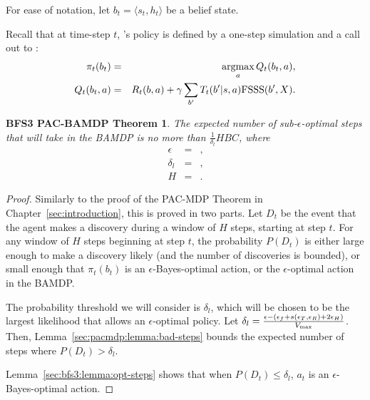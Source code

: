 For ease of notation, let $b_t = \langle s_t, h_t \rangle$ be a belief state.

Recall that at time-step $t$, 's policy is defined by a one-step simulation and a call out to :
\begin{eqnarray}
\pi_t(b_t) &=& \argmax_a Q_t(b_t,a),\\
Q_t(b_t,a) &=& R_t(b,a) + \gamma \sum_{b'} T_t(b'|s,a) \mbox{FSSS}(b',X).
\end{eqnarray}

\newtheorem*{bfs3thm}{BFS3 PAC-BAMDP Theorem}
\begin{bfs3thm}
The expected number of sub-$\epsilon$-optimal steps that  will take in the BAMDP is no more than $\frac 1 {\delta_l} H B C$, where
\begin{eqnarray}
\epsilon &=&,\\
\delta_l &=&,\\
H &=&.
\end{eqnarray}
\end{bfs3thm}

\begin{proof}
Similarly to the proof of the PAC-MDP Theorem in Chapter~\ref{sec:introduction}, this is proved in two parts. Let $D_t$ be the event that the agent makes a discovery during a window of $H$ steps, starting at step $t$. For any window of $H$ steps beginning at step $t$, the probability $P(D_t)$ is either large enough to make a discovery likely (and the number of discoveries is bounded), or small enough that $\pi_t(b_t)$ is an $\epsilon$-Bayes-optimal action, or the $\epsilon$-optimal action in the BAMDP.

The probability threshold we will consider is $\delta_l$, which will be chosen to be the largest likelihood that allows an $\epsilon$-optimal policy. Let $\delta_l = \frac {\epsilon - (\epsilon_f + s(\epsilon_T,\epsilon_R) +2 \epsilon_H)} {V_{\rm max}}$. Then, Lemma~\ref{sec:pacmdp:lemma:bad-steps} bounds the expected number of steps where $P(D_t)>\delta_l$.

Lemma~\ref{sec:bfs3:lemma:opt-steps} shows that when $P(D_t)\leq \delta_l$, $a_t$ is an $\epsilon$-Bayes-optimal action.
\end{proof}

